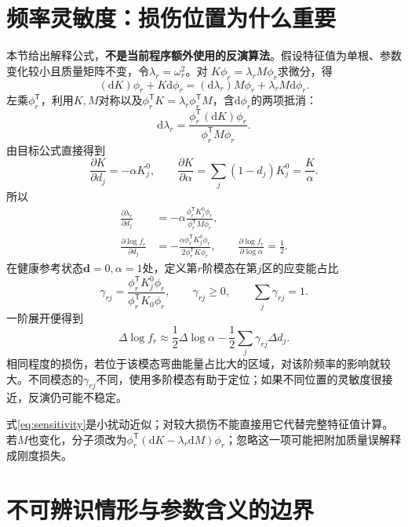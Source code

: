 \documentclass[UTF8,a4paper,11pt,fontset=fandol]{ctexart}
\numberwithin{equation}{section}
\newcommand{\dd}{\mathrm d}
\newcommand{\T}{^{\mathsf T}}
\begin{document}
\newpage
\section{频率灵敏度：损伤位置为什么重要}
本节给出解释公式，\textbf{不是当前程序额外使用的反演算法}。假设特征值为单根、参数变化较小且质量矩阵不变，令$\lambda_r=\omega_r^2$。对
$K\phi_r=\lambda_rM\phi_r$求微分，得
\begin{equation}
(\dd K)\phi_r+K\dd\phi_r
=(\dd\lambda_r)M\phi_r+\lambda_rM\dd\phi_r.
\end{equation}
左乘$\phi_r\T$，利用$K,M$对称以及$\phi_r\T K=\lambda_r\phi_r\T M$，含$\dd\phi_r$的两项抵消：
\begin{equation}\boxed{
\dd\lambda_r=\frac{\phi_r\T(\dd K)\phi_r}{\phi_r\T M\phi_r}.}
\end{equation}
由目标公式直接得到
\begin{equation}
\frac{\partial K}{\partial d_j}=-\alpha K_j^0,\qquad
\frac{\partial K}{\partial\alpha}=\sum_j(1-d_j)K_j^0=\frac K\alpha.
\end{equation}
所以
\begin{align}
\frac{\partial\lambda_r}{\partial d_j}
&=-\alpha\frac{\phi_r\T K_j^0\phi_r}{\phi_r\T M\phi_r},\\
\frac{\partial\log f_r}{\partial d_j}
&=-\frac{\alpha\phi_r\T K_j^0\phi_r}{2\phi_r\T K\phi_r},\qquad
\frac{\partial\log f_r}{\partial\log\alpha}=\frac12.
\end{align}
在健康参考状态$\bm d=0,\alpha=1$处，定义第$r$阶模态在第$j$区的应变能占比
\begin{equation}
\gamma_{rj}=\frac{\phi_r\T K_j^0\phi_r}{\phi_r\T K_0\phi_r},
\qquad\gamma_{rj}\ge0,\qquad\sum_j\gamma_{rj}=1.
\end{equation}
一阶展开便得到
\begin{equation}\boxed{
\Delta\log f_r\approx\frac12\Delta\log\alpha
-\frac12\sum_j\gamma_{rj}\Delta d_j.}\label{eq:sensitivity}
\end{equation}
相同程度的损伤，若位于该模态弯曲能量占比大的区域，对该阶频率的影响就较大。不同模态的$\gamma_{rj}$不同，使用多阶模态有助于定位；如果不同位置的灵敏度很接近，反演仍可能不稳定。

式\eqref{eq:sensitivity}是小扰动近似；对较大损伤不能直接用它代替完整特征值计算。若$M$也变化，分子须改为$\phi_r\T(\dd K-\lambda_r\dd M)\phi_r$；忽略这一项可能把附加质量误解释成刚度损失。

\newpage
\section{不可辨识情形与参数含义的边界}
\end{document}
